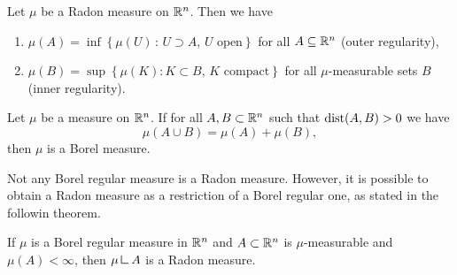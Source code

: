 \begin{theorem}
Let $\mu$ be a Radon measure on $\mathbb{R}^n$. Then we have
\begin{enumerate}[(1)]
\item $\mu(A) = \inf\left\{ \mu(U) \,:\,
U \supset A,\, U \text{ open}\right\}$ for all $A \subseteq \mathbb{R}^n$ \hfill (outer regularity),
\item $\mu(B) = \sup \left\{ \mu (K): K \subset B,\, K \text{ compact}\right\}$ for all $\mu$-measurable sets $B$ \hfill
(inner regularity).
\end{enumerate}
\end{theorem}

\begin{theorem} \label{caratheodory_criterion}
Let $\mu$ be a measure on $\mathbb{R}^n$. If for all $A,B \subset \mathbb{R}^n$ such that $\operatorname{dist}(A,B) > 0$ we have $$\mu(A \cup B) = \mu(A) + \mu(B),$$ then $\mu$
is a Borel measure.
\end{theorem}

Not any Borel regular measure is a Radon measure. However, it is possible to obtain a Radon measure as a restriction of a Borel regular one, as stated in the followin theorem.

\begin{theorem} \label{thm:Borel_restriction_Radon}
If $\mu$ is a Borel regular measure in $\mathbb{R}^n$ and $A \subset \mathbb{R}^n$ is
$\mu$-measurable and $\mu(A) < \infty$, then $\mu \mres A$ is a Radon measure. 
\end{theorem}

